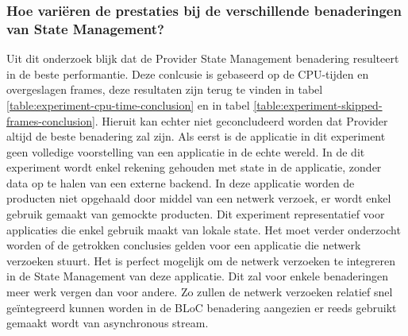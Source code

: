 \subsubsection{Hoe variëren de prestaties bij de verschillende benaderingen van State Management?}

Uit dit onderzoek blijk dat de Provider State Management benadering resulteert in de beste performantie. Deze conlcusie is gebaseerd op de CPU-tijden en overgeslagen frames, deze resultaten zijn terug te vinden in tabel \ref{table:experiment-cpu-time-conclusion} en in tabel \ref{table:experiment-skipped-frames-conclusion}. Hieruit kan echter niet geconcludeerd worden dat Provider altijd de beste benadering zal zijn. \newline \newline
Als eerst is de applicatie in dit experiment geen volledige voorstelling van een applicatie in de echte wereld. In de dit experiment wordt enkel rekening gehouden met state in de applicatie, zonder data op te halen van een externe backend. In deze applicatie worden de producten niet opgehaald door middel van een netwerk verzoek, er wordt enkel gebruik gemaakt van gemockte producten. Dit experiment representatief voor applicaties die enkel gebruik maakt van lokale state. Het moet verder onderzocht worden of de getrokken conclusies gelden voor een applicatie die netwerk verzoeken stuurt. \newline
Het is perfect mogelijk om de netwerk verzoeken te integreren in de State Management van deze applicatie. Dit zal voor enkele benaderingen meer werk vergen dan voor andere. Zo zullen de netwerk verzoeken relatief snel geïntegreerd kunnen worden in de BLoC benadering aangezien er reeds gebruikt gemaakt wordt van asynchronous stream. \newline 

